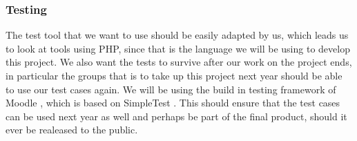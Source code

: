 \subsubsection{Testing}
The test tool that we want to use should be easily adapted by us, which leads us to look at tools using PHP, since that is the language we will be using to develop this project.
We also want the tests to survive after our work on the project ends, in particular the groups that is to take up this project next year should be able to use our test cases again.
We will be using the build in testing framework of Moodle \cite{moodletest}, which is based on SimpleTest \cite{simpletest}.
This should ensure that the test cases can be used next year as well and perhaps be part of the final product, should it ever be realeased to the public.










